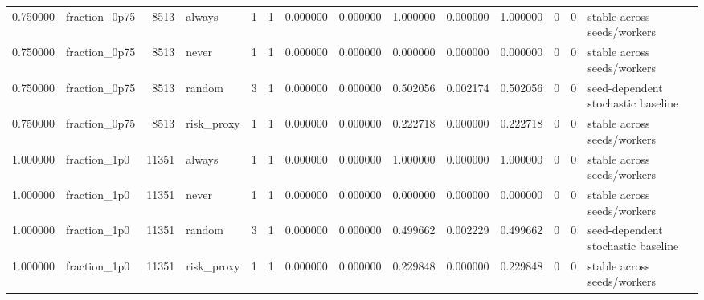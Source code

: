 \begin{tabular}{rlrlrrrrrrrrrl}
0.750000 & fraction\_0p75 & 8513 & always & 1 & 1 & 0.000000 & 0.000000 & 1.000000 & 0.000000 & 1.000000 & 0 & 0 & stable across seeds/workers \\
0.750000 & fraction\_0p75 & 8513 & never & 1 & 1 & 0.000000 & 0.000000 & 0.000000 & 0.000000 & 0.000000 & 0 & 0 & stable across seeds/workers \\
0.750000 & fraction\_0p75 & 8513 & random & 3 & 1 & 0.000000 & 0.000000 & 0.502056 & 0.002174 & 0.502056 & 0 & 0 & seed-dependent stochastic baseline \\
0.750000 & fraction\_0p75 & 8513 & risk\_proxy & 1 & 1 & 0.000000 & 0.000000 & 0.222718 & 0.000000 & 0.222718 & 0 & 0 & stable across seeds/workers \\
1.000000 & fraction\_1p0 & 11351 & always & 1 & 1 & 0.000000 & 0.000000 & 1.000000 & 0.000000 & 1.000000 & 0 & 0 & stable across seeds/workers \\
1.000000 & fraction\_1p0 & 11351 & never & 1 & 1 & 0.000000 & 0.000000 & 0.000000 & 0.000000 & 0.000000 & 0 & 0 & stable across seeds/workers \\
1.000000 & fraction\_1p0 & 11351 & random & 3 & 1 & 0.000000 & 0.000000 & 0.499662 & 0.002229 & 0.499662 & 0 & 0 & seed-dependent stochastic baseline \\
1.000000 & fraction\_1p0 & 11351 & risk\_proxy & 1 & 1 & 0.000000 & 0.000000 & 0.229848 & 0.000000 & 0.229848 & 0 & 0 & stable across seeds/workers \\
\bottomrule
\end{tabular}
